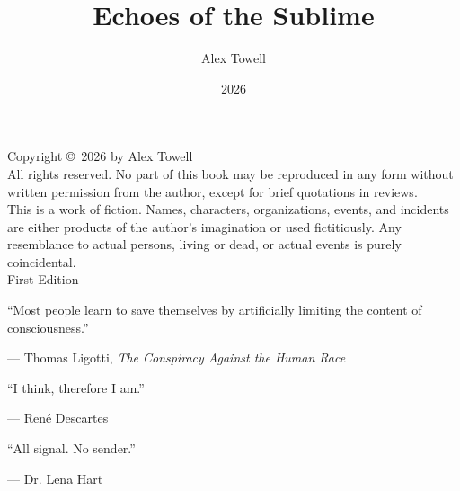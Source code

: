 \documentclass[12pt]{book}
\title{\textbf{Echoes of the Sublime}}
\author{Alex Towell}
\date{2026}
\begin{document}
\frontmatter
\maketitle
\thispagestyle{empty}
\cleardoublepage

\thispagestyle{empty}
\vspace*{\fill}
\begin{center}
Copyright \copyright\ 2026 by Alex Towell\\[1em]
All rights reserved. No part of this book may be reproduced in any form
without written permission from the author, except for brief quotations
in reviews.\\[2em]
This is a work of fiction. Names, characters, organizations, events, and
incidents are either products of the author's imagination or used
fictitiously. Any resemblance to actual persons, living or dead, or
actual events is purely coincidental.\\[2em]
First Edition
\end{center}
\vspace*{\fill}
\cleardoublepage

\thispagestyle{empty}
\vspace*{\fill}
\epigraph{``Most people learn to save themselves by artificially limiting the content of consciousness.''}{--- Thomas Ligotti, \textit{The Conspiracy Against the Human Race}}
\vspace{1em}
\epigraph{``I think, therefore I am.''}{--- René Descartes}
\vspace{1em}
\epigraph{``All signal. No sender.''}{--- Dr. Lena Hart}
\vspace*{\fill}
\cleardoublepage

\tableofcontents
\cleardoublepage

\mainmatter


















\backmatter




%

\end{document}
